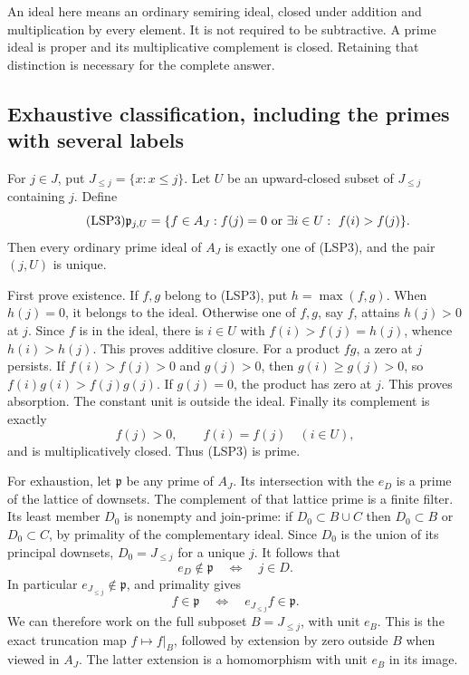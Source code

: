An ideal here means an ordinary semiring ideal, closed under addition
and multiplication by every element. It is not required to be
subtractive. A prime ideal is proper and its multiplicative
complement is closed. Retaining that distinction is necessary for
the complete answer.

\subsection{Exhaustive classification, including the primes with several labels}

For $j\in J$, put $J_{\le j}=\{x:x\le j\}$. Let $U$ be an
upward-closed subset of $J_{\le j}$ containing $j$. Define
\begin{equation}\tag{LSP3}
 \mathfrak p_{j,U}
 =\{f\in A_J:f(j)=0\ \hbox{or}
                  \ \exists i\in U:\ f(i)>f(j)\}.
\end{equation}
Then every ordinary prime ideal of $A_J$ is exactly one of
(LSP3), and the pair $(j,U)$ is unique.

First prove existence. If $f,g$ belong to (LSP3), put
$h=\max(f,g)$. When $h(j)=0$, it belongs to the ideal. Otherwise
one of $f,g$, say $f$, attains $h(j)>0$ at $j$. Since $f$ is in
the ideal, there is $i\in U$ with $f(i)>f(j)=h(j)$, whence
$h(i)>h(j)$. This proves additive closure. For a product $fg$, a
zero at $j$ persists. If $f(i)>f(j)>0$ and $g(j)>0$, then
$g(i)\ge g(j)>0$, so $f(i)g(i)>f(j)g(j)$. If $g(j)=0$, the
product has zero at $j$. This proves absorption. The constant unit
is outside the ideal. Finally its complement is exactly
\begin{equation}\tag{LSP4}
 f(j)>0,\qquad f(i)=f(j)\quad(i\in U),
\end{equation}
and is multiplicatively closed. Thus (LSP3) is prime.

For exhaustion, let $\mathfrak p$ be any prime of $A_J$. Its
intersection with the $e_D$ is a prime of the lattice of downsets.
The complement of that lattice prime is a finite filter. Its least
member $D_0$ is nonempty and join-prime: if $D_0\subset B\cup C$
then $D_0\subset B$ or $D_0\subset C$, by primality of the
complementary ideal. Since $D_0$ is the union of its principal
downsets, $D_0=J_{\le j}$ for a unique $j$. It follows that
\begin{equation}\tag{LSP5}
 e_D\notin\mathfrak p\quad\Longleftrightarrow\quad j\in D.
\end{equation}
In particular $e_{J_{\le j}}\notin\mathfrak p$, and primality
gives
\[
 f\in\mathfrak p\quad\Longleftrightarrow\quad
 e_{J_{\le j}}f\in\mathfrak p.
\]
We can therefore work on the full subposet $B=J_{\le j}$, with
unit $e_B$. This is the exact truncation map $f\mapsto f|_B$,
followed by extension by zero outside $B$ when viewed in $A_J$.
The latter extension is a homomorphism with unit $e_B$ in its image.

